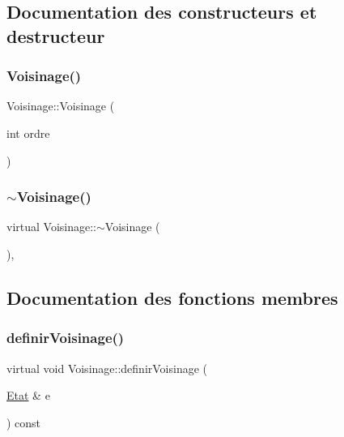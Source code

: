 \subsection{Documentation des constructeurs et destructeur}
\mbox{\label{class_voisinage_a9e27105f5e2dcd5e97d2fb86836dd2c5}} 
\subsubsection{\texorpdfstring{Voisinage()}{Voisinage()}}
{\footnotesize\ttfamily Voisinage\+::\+Voisinage (\begin{DoxyParamCaption}\item[{int}]{ordre }\end{DoxyParamCaption})\hspace{0.3cm}{\ttfamily [inline]}}

\mbox{\label{class_voisinage_ab96dc57aa577e3c00d9a65b71c538f17}} 
\subsubsection{\texorpdfstring{$\sim$\+Voisinage()}{~Voisinage()}}
{\footnotesize\ttfamily virtual Voisinage\+::$\sim$\+Voisinage (\begin{DoxyParamCaption}{ }\end{DoxyParamCaption})\hspace{0.3cm}{\ttfamily [virtual]}, {\ttfamily [default]}}



\subsection{Documentation des fonctions membres}
\mbox{\label{class_voisinage_ac12f70bf8e971cbc8eaf8394de270d07}} 
\subsubsection{\texorpdfstring{definir\+Voisinage()}{definirVoisinage()}}
{\footnotesize\ttfamily virtual void Voisinage\+::definir\+Voisinage (\begin{DoxyParamCaption}\item[{\mbox{\hyperlink{class_etat}{Etat}} \&}]{e }\end{DoxyParamCaption}) const\hspace{0.3cm}{\ttfamily [pure virtual]}}



